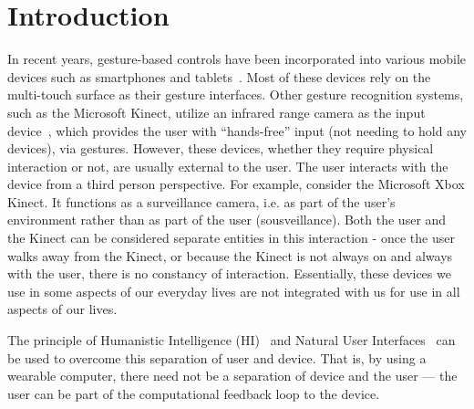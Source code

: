 \section{Introduction}
In recent years, gesture-based controls have been incorporated into various
mobile devices such as smartphones and tablets~\cite{androidgestures,bbgeestures,bbgesturesz10}. Most of these
devices rely on the multi-touch surface as their gesture interfaces. Other
gesture recognition systems, such as the Microsoft Kinect, utilize an
infrared range camera as the input device~\cite{msprimesense2010press},
which provides the user with ``hands-free'' input (not needing to hold any
devices), via gestures. However, these devices, whether they require physical
interaction or not, are usually external to the user. The user interacts
with the device from a third person perspective. For example, consider
the Microsoft Xbox Kinect. It functions as a
surveillance camera, i.e. as part of the user's environment
rather than as part of the user (sousveillance). Both the user and
the Kinect can be considered separate entities in
this interaction - once the user walks away from the Kinect, or because
the Kinect is not always on and always with the user,
there is no constancy of interaction.
Essentially, these devices we use in some aspects of our everyday lives
are not integrated with us for use in all aspects of our lives.

The principle of Humanistic Intelligence (HI)~\cite{mann2001wearable}
and Natural User Interfaces~\cite{mann2001intelligent}
can be used to overcome this separation of user and device. That is,
by using a wearable computer, there need not be a separation of device and
the user --- the user can be part of the computational
feedback loop to the device.

